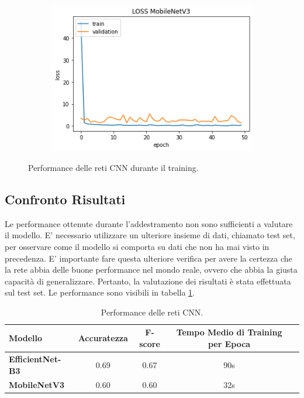 \documentclass[11pt]{report}
\begin{document}
\begin{figure}[h]
\begin{subfigure}[t]{.45\textwidth}
	\end{subfigure}
	\quad
	\begin{subfigure}[t]{.45\textwidth}
	\centering
    \includegraphics[scale = 0.5]{img/Loss-mobile.png}
	\end{subfigure}
	\quad
\caption{Performance delle reti CNN durante il training.}
\label{fig:train-CNN}
\end{figure}


\subsection{Confronto Risultati}

Le performance ottenute durante l'addestramento non sono sufficienti a valutare il modello. E' necessario utilizzare un ulteriore insieme di dati, chiamato test set, per osservare come il modello si comporta su dati che non ha mai visto in precedenza. E' importante fare questa ulteriore verifica per avere la certezza che la rete abbia delle buone performance nel mondo reale, ovvero che abbia la giusta capacità di generalizzare. Pertanto, la valutazione dei risultati è stata effettuata sul test set. Le performance sono visibili in tabella \ref{tab2}.

\newpage

\begin{table}[h]
\caption{Performance delle reti CNN.}
\label{tab2}
\centering
\begin{tabular}{|l|c|c|c|c|}
\hline
\textbf{Modello} &  \textbf{Accuratezza} & \textbf{F-score}  & \textbf{Tempo Medio di Training per Epoca}\\
\hline
\textbf{EfficientNet-B3} &  0.69  & 0.67 & 90s\\
\textbf{MobileNetV3} &  0.60 & 0.60 & 32s\\
\hline
\end{tabular}
\end{table}
\end{document}
